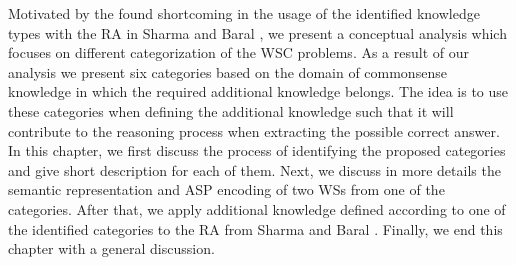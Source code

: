 


Motivated by the found shortcoming in the usage of the identified knowledge types with the RA in Sharma and Baral \cite{2018CommonsenseKT}, we present a conceptual analysis which focuses on different categorization of the WSC problems. As a result of our analysis we present six categories based on the domain of commonsense knowledge in which the required additional knowledge belongs. The idea is to use these categories when defining the additional knowledge such that it will contribute to the reasoning process when extracting the possible correct answer. In this chapter, we first discuss the process of identifying the proposed categories and give short description for each of them. Next, we discuss in more details the semantic representation and ASP encoding of two WSs from one of the categories. After that, we apply additional knowledge defined according to one of the identified categories to the RA from Sharma and Baral \cite{2018CommonsenseKT}. Finally, we end this chapter with a general discussion.
  
\begin{comment}
Similarly as in Sharma et al. \cite{DBLP:conf/ijcai/SharmaVAB15} and in Sharma and Baral \cite{2018CommonsenseKT}, we identify categories of knowledge which are needed in order to answer the questions from the WSs. 
The identified categories are based on the domains of commonsense knowledge from which the required knowledge is.  
We identified six categories with which all problems from the WSC corpus were categorized.
We use the KParser for extracting the semantic graph representation of the sentence. Next we are interested into identifying the relevant knowledge which is needed for resolving the ambiguous pronoun. 
We use the KParser for extracting the graph representation of the input sentence and question. Furthermore, we use the Reasoning Algorithm given in \cite{2018CommonsenseKT} for finding the correct answer with some small modification which will be explained later.
\end{comment}



